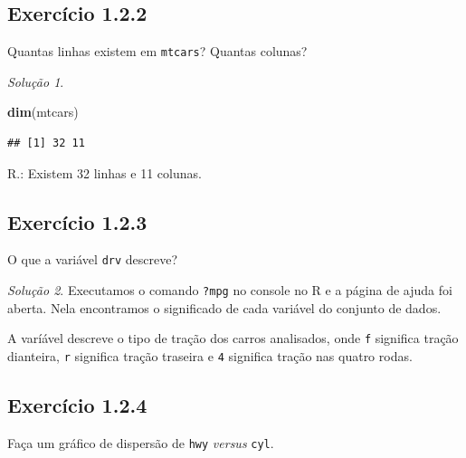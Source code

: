 \documentclass[
]{latex/krantz}
\newenvironment{Shaded}{\begin{snugshade}}{\end{snugshade}}
\newcommand{\FunctionTok}[1]{\textcolor[rgb]{0.13,0.29,0.53}{\textbf{#1}}}
\newcommand{\NormalTok}[1]{#1}
\theoremstyle{definition}
\theoremstyle{definition}
\theoremstyle{definition}
\theoremstyle{definition}
\theoremstyle{remark}
\newtheorem*{solution}{Solução}
\begin{document}
\hypertarget{exr1-2-2}{%
\subsection*{Exercício 1.2.2}\label{exr1-2-2}}

Quantas linhas existem em \texttt{mtcars}? Quantas colunas?

\begin{solution}
\leavevmode

\begin{Shaded}
\begin{Highlighting}[]
\FunctionTok{dim}\NormalTok{(mtcars)}
\end{Highlighting}
\end{Shaded}

\begin{verbatim}
## [1] 32 11
\end{verbatim}

R.: Existem 32 linhas e 11 colunas.

\end{solution}

\hypertarget{exr1-2-3}{%
\subsection*{Exercício 1.2.3}\label{exr1-2-3}}

O que a variável \texttt{drv} descreve?

\begin{solution}
Executamos o comando \texttt{?mpg} no console no R e a página de ajuda foi aberta. Nela encontramos o significado de cada variável do conjunto de dados.

A varíável descreve o tipo de tração dos carros analisados, onde \texttt{f} significa tração dianteira, \texttt{r} significa tração traseira e \texttt{4} significa tração nas quatro rodas.
\end{solution}

\hypertarget{ex1-2-4}{%
\subsection*{Exercício 1.2.4}\label{ex1-2-4}}

Faça um gráfico de dispersão de \texttt{hwy} \emph{versus} \texttt{cyl}.
\end{document}
